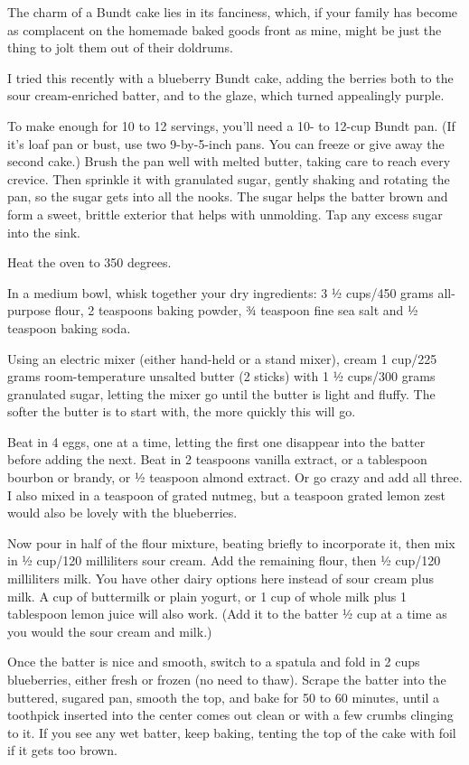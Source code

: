 The charm of a Bundt cake lies in its fanciness, which, if your family
has become as complacent on the homemade baked goods front as mine,
might be just the thing to jolt them out of their doldrums.

I tried this recently with a blueberry Bundt cake, adding the berries
both to the sour cream-enriched batter, and to the glaze, which turned
appealingly purple.

To make enough for 10 to 12 servings, you'll need a 10- to 12-cup Bundt
pan. (If it's loaf pan or bust, use two 9-by-5-inch pans. You can freeze
or give away the second cake.) Brush the pan well with melted butter,
taking care to reach every crevice. Then sprinkle it with granulated
sugar, gently shaking and rotating the pan, so the sugar gets into all
the nooks. The sugar helps the batter brown and form a sweet, brittle
exterior that helps with unmolding. Tap any excess sugar into the sink.

Heat the oven to 350 degrees.

In a medium bowl, whisk together your dry ingredients: 3 ½ cups/450
grams all-purpose flour, 2 teaspoons baking powder, ¾ teaspoon fine sea
salt and ½ teaspoon baking soda.

Using an electric mixer (either hand-held or a stand mixer), cream 1
cup/225 grams room-temperature unsalted butter (2 sticks) with 1 ½
cups/300 grams granulated sugar, letting the mixer go until the butter
is light and fluffy. The softer the butter is to start with, the more
quickly this will go.

Beat in 4 eggs, one at a time, letting the first one disappear into the
batter before adding the next. Beat in 2 teaspoons vanilla extract, or a
tablespoon bourbon or brandy, or ½ teaspoon almond extract. Or go crazy
and add all three. I also mixed in a teaspoon of grated nutmeg, but a
teaspoon grated lemon zest would also be lovely with the blueberries.

Now pour in half of the flour mixture, beating briefly to incorporate
it, then mix in ½ cup/120 milliliters sour cream. Add the remaining
flour, then ½ cup/120 milliliters milk. You have other dairy options
here instead of sour cream plus milk. A cup of buttermilk or plain
yogurt, or 1 cup of whole milk plus 1 tablespoon lemon juice will also
work. (Add it to the batter ½ cup at a time as you would the sour cream
and milk.)

Once the batter is nice and smooth, switch to a spatula and fold in 2
cups blueberries, either fresh or frozen (no need to thaw). Scrape the
batter into the buttered, sugared pan, smooth the top, and bake for 50
to 60 minutes, until a toothpick inserted into the center comes out
clean or with a few crumbs clinging to it. If you see any wet batter,
keep baking, tenting the top of the cake with foil if it gets too brown.

